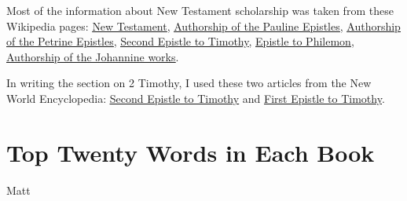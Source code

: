\documentclass[12pt,letterpaper]{article}
\begin{document}
Most of the information about New Testament scholarship was taken from these Wikipedia pages: \underline{\href{https://en.wikipedia.org/wiki/New_Testament}{New Testament}}, \underline{\href{https://en.wikipedia.org/wiki/Authorship_of_the_Pauline_epistles}{Authorship of the Pauline Epistles}}, \underline{\href{https://en.wikipedia.org/wiki/Authorship_of_the_Petrine_epistles}{Authorship of the Petrine Epistles}}, \underline{\href{https://en.wikipedia.org/wiki/Second_Epistle_to_Timothy}{Second Epistle to Timothy}}, \underline{\href{https://en.wikipedia.org/wiki/Epistle_to_Philemon}{Epistle to Philemon}}, \underline{\href{https://en.wikipedia.org/wiki/Authorship_of_the_Johannine_works}{Authorship of the Johannine works}}. 

In writing the section on 2 Timothy, I used these two articles from the New World Encyclopedia: \underline{\href{https://www.newworldencyclopedia.org/entry/Second_Epistle_to_Timothy}{Second Epistle to Timothy}} and \underline{\href{https://www.newworldencyclopedia.org/entry/First_Epistle_to_Timothy}{First Epistle to Timothy}}.  

\newpage 

\appendix
\section{Top Twenty Words in Each Book}

Matt
\end{document}

